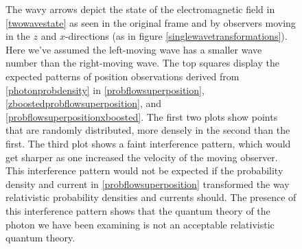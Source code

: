 \documentclass[12pt,secnumarabic,amsmath,amssymb,balancelastpage,nofootinbib]{article}
\begin{document}
\begin{figure}[h!]
\caption{The wavy arrows depict the state of the electromagnetic field in \eqref{twowavestate} as seen in the original frame and by observers moving in the $z$ and $x$-directions (as in figure \ref{singlewavetransformations}).  Here we've assumed the left-moving wave has a smaller wave number than the right-moving wave.  The top squares display the expected patterns of position observations derived from \eqref{photonprobdensity} in \eqref{probflowsuperposition}, \eqref{zboostedprobflowsuperposition}, and \eqref{probflowsuperpositionxboosted}.  The first two plots show points that are randomly distributed, more densely in the second than the first.  The third plot shows a faint interference pattern, which would get sharper as one increased the velocity of the moving observer.  This interference pattern would not be expected if the probability density and current in \eqref{probflowsuperposition} transformed the way relativistic probability densities and currents should.  The presence of this interference pattern shows that the quantum theory of the photon we have been examining is not an acceptable relativistic quantum theory.}
\label{doublewavetransformations}
\end{figure}
\end{document}
